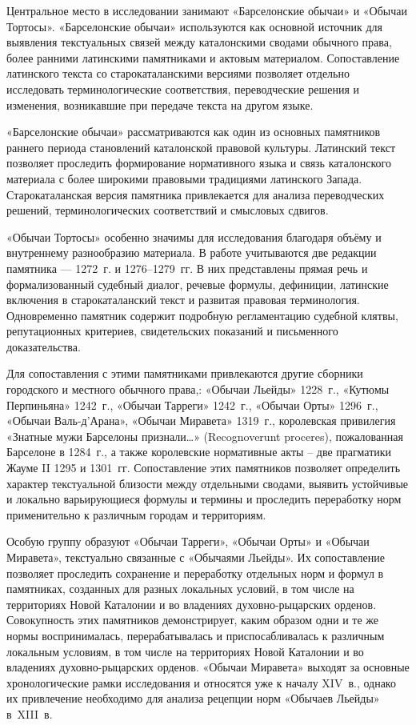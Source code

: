 Центральное место в исследовании занимают «Барселонские обычаи» и «Обычаи Тортосы». «Барселонские обычаи» используются как основной источник для выявления текстуальных связей между каталонскими сводами обычного права, более ранними латинскими памятниками и актовым материалом. Сопоставление латинского текста со старокаталанскими версиями позволяет отдельно исследовать терминологические соответствия, переводческие решения и изменения, возникавшие при передаче текста на другом языке.

«Барселонские обычаи» рассматриваются как один из основных памятников раннего периода становлений каталонской правовой культуры. Латинский текст позволяет проследить формирование нормативного языка и связь каталонского материала с более широкими правовыми традициями латинского Запада. Старокаталанская версия памятника привлекается для анализа переводческих решений, терминологических соответствий и смысловых сдвигов.

«Обычаи Тортосы» особенно значимы для исследования благодаря объёму и внутреннему разнообразию материала. В работе учитываются две редакции памятника --- 1272~г. и 1276--1279~гг. В них представлены прямая речь и формализованный судебный диалог, речевые формулы, дефиниции, латинские включения в старокаталанский текст и развитая правовая терминология. Одновременно памятник содержит подробную регламентацию судебной клятвы, репутационных критериев, свидетельских показаний и письменного доказательства.

Для сопоставления с этими памятниками привлекаются другие сборники городского и местного обычного права,: «Обычаи Льейды» 1228~г., «Кутюмы Перпиньяна» 1242~г., «Обычаи Тарреги» 1242~г., «Обычаи Орты» 1296~г., «Обычаи Валь-д’Арана», «Обычаи Миравета» 1319~г., королевская привилегия «Знатные мужи Барселоны признали…» (Recognoverunt proceres), пожалованная Барселоне в 1284~г., а также королевские нормативные акты -- две прагматики Жауме II 1295 и 1301~гг. Сопоставление этих памятников позволяет определить характер текстуальной близости между отдельными сводами, выявить устойчивые и локально варьирующиеся формулы и термины и проследить переработку норм применительно к различным городам и территориям.

Особую группу образуют «Обычаи Тарреги», «Обычаи Орты» и «Обычаи Миравета», текстуально связанные с «Обычаями Льейды». Их сопоставление позволяет проследить сохранение и переработку отдельных норм и формул в памятниках, созданных для разных локальных условий, в том числе на территориях Новой Каталонии и во владениях духовно-рыцарских орденов. Совокупность этих памятников демонстрирует, каким образом одни и те же нормы воспринималась, перерабатывалась и приспосабливалась к различным локальным условиям, в том числе на территориях Новой Каталонии и во владениях духовно-рыцарских орденов. «Обычаи Миравета» выходят за основные хронологические рамки исследования и относятся уже к началу XIV~в., однако их привлечение необходимо для анализа рецепции норм «Обычаев Льейды» в~XIII~в.


